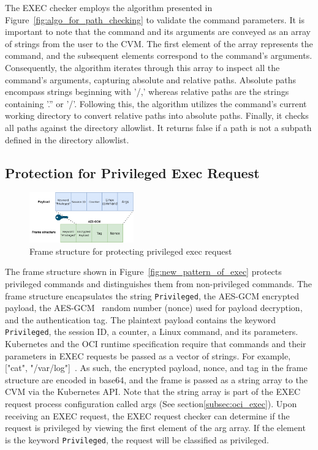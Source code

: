 The EXEC checker employs the algorithm presented in Figure~\ref{fig:algo_for_path_checking} to validate the command parameters. It is important to note that the command and its arguments are conveyed as an array of strings from the user to the \acrshort{CVM}. The first element of the array represents the command, and the subsequent elements 
correspond to the command's arguments. Consequently, the algorithm iterates through this array to inspect all the command's arguments, capturing absolute and relative paths. Absolute paths encompass strings beginning with '/,' whereas relative paths are the strings containing '.'' or '/'. Following 
this, the algorithm utilizes the command's current working directory to convert relative paths into absolute paths. Finally, it checks all paths against the directory allowlist. It returns false if a path is not a subpath defined in the directory allowlist.


\subsection{Protection for Privileged Exec Request}
\label{sec:design_prptect_privileged_request}
\begin{figure}[!htb]
    \centering
    \includegraphics[width=0.4\textwidth]{images/exec_frame.png}
    \caption[Frame structure  for protecting privileged exec request]{Frame structure  for protecting privileged exec request}
    \label{fig:exec_frame}
\end{figure}
The frame structure shown in Figure~\ref{fig:new_pattern_of_exec} protects privileged commands and distinguishes them from non-privileged commands. The frame structure encapsulates the string \texttt{Privileged}, the AES-GCM encrypted payload, the AES-GCM~\cite*{aes_gcm} random number (nonce) used 
for payload decryption, and the authentication tag. The plaintext payload contains the keyword \texttt{Privileged}, the session ID, a counter,  a Linux command, and its parameters. Kubernetes and the OCI runtime specification require that commands and their parameters in EXEC requests be passed as 
a vector of strings. For example, ["cat", "/var/log"]~\cite*{k8s}. As such, the encrypted payload, nonce, and tag in the frame structure are encoded in base64, and the frame is passed as a string array to the \acrshort{CVM} via the Kubernetes API. Note that the string array is part of the EXEC request process configuration called args (See section\ref{subsec:oci_exec}). Upon receiving an EXEC request, 
the EXEC request checker can determine if the request is privileged by viewing the first element of the arg array. If the element is the keyword \texttt{Privileged}, the request will be classified as privileged.

